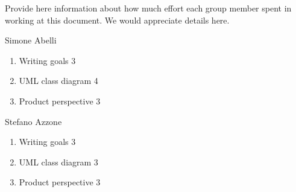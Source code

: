 Provide here information about how much effort each group member spent in working at this document. We would appreciate details here.

Simone Abelli
\begin{enumerate}
	\item Writing goals 3
	\item UML class diagram 4
	\item Product perspective 3
\end{enumerate}

Stefano Azzone
\begin{enumerate}
	\item Writing goals 3
	\item UML class diagram 3
	\item Product perspective 3
\end{enumerate}